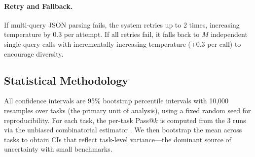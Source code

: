 \documentclass[11pt]{article}
\begin{document}
\paragraph{Retry and Fallback.}
If multi-query JSON parsing fails, the system retries up to 2 times, increasing temperature by 0.3 per attempt.
If all retries fail, it falls back to $M$ independent single-query calls with incrementally increasing temperature (+0.3 per call) to encourage diversity.

\newcommand{\courtinstruction}{\textbf{Task instruction:} Fill the California Small Claims Court form at \texttt{/root/sc100-blank.pdf} based on the case description below, and save the filled one to \texttt{/root/sc100-filled.pdf}. Only fill in the necessary fields and leave the court-filled, optional fields or fields not mentioned in the case description below empty. Use this date format: xxxx-xx-xx. Case Description: I am Joyce He. It's my first time suing by small claims. I live in 655 S Fair Oaks Ave, Sunnyvale, CA 94086, my phone \# is 4125886066, email: he1998@gmail.com. I want to sue Zhi Chen in 299 W Washington Ave, Sunnyvale, CA 94086. His phone \#: 5125658878. He failed to return my security deposit of amount \$1500 based on the signed roommate sublease contract after moving out. This situation happened from 2025-09-30 until 2026-01-19. I have asked him to return the money multiple times via text but he's not responding. The amount is listed on the signed roommate sublease contract. We both live in Sunnyvale, so I am filing where defendant lives. Please file it with date: January 19, 2026.}

\begin{table}[t]
  \centering
  \caption{Example query generation outputs for the \texttt{court-form-filling} task.
  The task instruction is shown at the top, followed by the generated queries for $M = 1$ (single-query prompt) and $M = 5$ (multi-query prompt).}
  \label{tab:query_examples}
  
\end{table}

\subsection{Statistical Methodology}
\label{sec:statistical_methodology}

All confidence intervals are 95\% bootstrap percentile intervals with 10{,}000 resamples over tasks (the primary unit of analysis), using a fixed random seed for reproducibility.
For each task, the per-task Pass@$k$ is computed from the 3 runs via the unbiased combinatorial estimator \citep{chen2021evaluating}. We then bootstrap the mean across tasks to obtain CIs that reflect task-level variance---the dominant source of uncertainty with small benchmarks.
\end{document}
